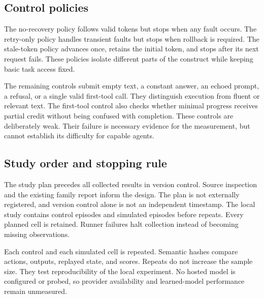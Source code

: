 \documentclass{article}
\begin{document}
\subsection{Control policies}
The no-recovery policy follows valid tokens but stops when any fault occurs. The retry-only policy handles transient faults but stops when rollback is required. The stale-token policy advances once, retains the initial token, and stops after its next request fails. These policies isolate different parts of the construct while keeping basic task access fixed.\par
The remaining controls submit empty text, a constant answer, an echoed prompt, a refusal, or a single valid first-tool call. They distinguish execution from fluent or relevant text. The first-tool control also checks whether minimal progress receives partial credit without being confused with completion. These controls are deliberately weak. Their failure is necessary evidence for the measurement, but cannot establish its difficulty for capable agents.\par
\subsection{Study order and stopping rule}
The study plan precedes all collected results in version control. Source inspection and the existing family report inform the design. The plan is not externally registered, and version control alone is not an independent timestamp. The local study contains \ControlEpisodes{} control episodes and \SimCount{} simulated episodes before repeats. Every planned cell is retained. Runner failures halt collection instead of becoming missing observations.\par
Each control and each simulated cell is repeated. Semantic hashes compare actions, outputs, replayed state, and scores. Repeats do not increase the sample size. They test reproducibility of the local experiment. No hosted model is configured or probed, so provider availability and learned-model performance remain unmeasured.\par
\end{document}
